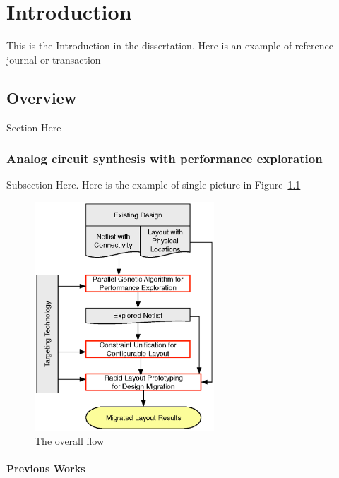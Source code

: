 \chapter{Introduction}\label{chap:Intro}

  This is the Introduction in the dissertation. Here is an example of reference journal or transaction ~\cite{msc-bhattacharya-tcad06}

  \section{Overview}\label{sec:overview}

    Section Here

    \subsection{Analog circuit synthesis with performance exploration}\label{subsec:PAGEOverview}

      Subsection Here. Here is the example of single picture in Figure~\ref{fig:OverallFlow}

      \begin{figure}[ht]
        \centerline{
        \includegraphics[width=0.6\textwidth]{Fig/Introduction/OverallFlow.eps}}
        \caption{The overall flow} 
        \label{fig:OverallFlow}
      \end{figure}

      \subsubsection{Previous Works}
        
